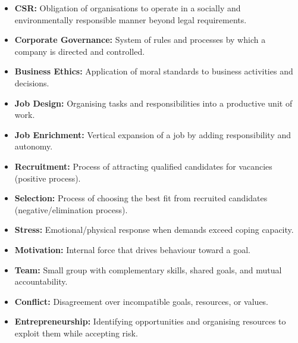 \documentclass[12pt,a4paper]{article}
\begin{document}
\begin{tcolorbox}[defbox, title={\textbf{One-Line Definitions}}]
\begin{itemize}[leftmargin=*, itemsep=2pt, topsep=0pt]
  \item \textbf{CSR:} Obligation of organisations to operate in a socially and environmentally responsible manner beyond legal requirements.
  \item \textbf{Corporate Governance:} System of rules and processes by which a company is directed and controlled.
  \item \textbf{Business Ethics:} Application of moral standards to business activities and decisions.
  \item \textbf{Job Design:} Organising tasks and responsibilities into a productive unit of work.
  \item \textbf{Job Enrichment:} Vertical expansion of a job by adding responsibility and autonomy.
  \item \textbf{Recruitment:} Process of attracting qualified candidates for vacancies (positive process).
  \item \textbf{Selection:} Process of choosing the best fit from recruited candidates (negative/elimination process).
  \item \textbf{Stress:} Emotional/physical response when demands exceed coping capacity.
  \item \textbf{Motivation:} Internal force that drives behaviour toward a goal.
  \item \textbf{Team:} Small group with complementary skills, shared goals, and mutual accountability.
  \item \textbf{Conflict:} Disagreement over incompatible goals, resources, or values.
  \item \textbf{Entrepreneurship:} Identifying opportunities and organising resources to exploit them while accepting risk.
\end{itemize}
\end{tcolorbox}
\end{document}
